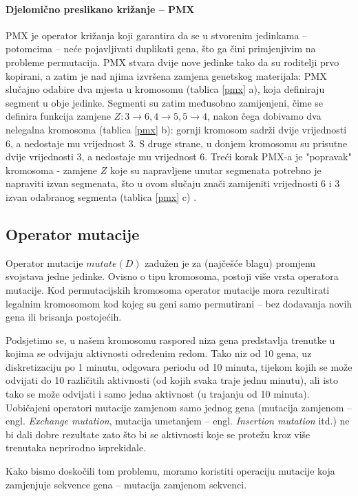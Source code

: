 \documentclass[times, utf8, zavrsni]{fer}
\begin{document}
\paragraph{Djelomično preslikano križanje -- PMX} PMX je operator križanja koji garantira da se u stvorenim jedinkama -- potomcima -- neće pojavljivati duplikati gena, što ga čini primjenjivim na probleme permutacija. PMX stvara dvije nove jedinke tako da su roditelji prvo kopirani, a zatim je nad njima izvršena zamjena genetskog materijala: PMX slučajno odabire dva mjesta u kromosomu (tablica \ref{pmx} a), koja definiraju segment u obje jedinke. Segmenti su zatim međusobno zamijenjeni, čime se definira funkcija zamjene $Z : 3\rightarrow6, 4\rightarrow5, 5\rightarrow4$, nakon čega dobivamo dva nelegalna kromosoma (tablica \ref{pmx} b): gornji kromosom sadrži dvije vrijednosti 6, a nedostaje mu vrijednost 3. S druge strane, u donjem kromosomu su prisutne dvije vrijednosti 3, a nedostaje mu vrijednost 6. Treći korak PMX-a je "popravak" kromosoma - zamjene $Z$ koje su napravljene unutar segmenata potrebno je napraviti izvan segmenata, što u ovom slučaju znači zamijeniti vrijednosti 6 i 3 izvan odabranog segmenta (tablica \ref{pmx} c) \citep{jenetics_userguide}.

\subsection{Operator mutacije}
Operator mutacije $mutate(D)$ zadužen je za (najčešće blagu) promjenu svojstava jedne jedinke. Ovisno o tipu kromosoma, postoji više vrsta operatora mutacije. Kod permutacijskih kromosoma operator mutacije mora rezultirati legalnim kromosomom kod kojeg su geni samo permutirani -- bez dodavanja novih gena ili brisanja postojećih.

Podsjetimo se, u našem kromosomu raspored niza gena predstavlja trenutke u kojima se odvijaju aktivnosti određenim redom. Tako niz od 10 gena, uz diskretizaciju po 1 minutu, odgovara periodu od 10 minuta, tijekom kojih se može odvijati do 10 različitih aktivnosti (od kojih svaka traje jednu minutu), ali isto tako se može odvijati i samo jedna aktivnost (u trajanju od 10 minuta).
Uobičajeni operatori mutacije zamjenom samo jednog gena (mutacija zamjenom -- engl. \textit{Exchange mutation}, mutacija umetanjem -- engl. \textit{Insertion mutation} itd.) ne bi dali dobre rezultate zato što bi se aktivnosti koje se protežu kroz više trenutaka neprirodno isprekidale.

Kako bismo doskočili tom problemu, moramo koristiti operaciju mutacije koja zamjenjuje sekvence gena -- mutacija zamjenom sekvenci.
\end{document}
